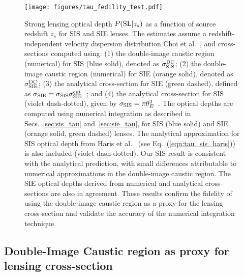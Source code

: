 \documentclass[aps,prd,twocolumn,superscriptaddress,groupedaddress,nofootinbib,showpacs,eqsecnum]{revtex4-1}
\begin{document}
\begin{figure}[ht!]
  \centering
  \hspace*{-0.02\textwidth}%
  \texttt{[image: figures/tau\_fedility\_test.pdf]}
  \caption{Strong lensing optical depth $P({\rm SL}|z_s)$ as a function of source redshift $z_s$ for SIS and SIE lenses. 
  The estimates assume a redshift-independent velocity dispersion distribution Choi et al.~\cite{Choi2007}, and cross-sections computed using: (1) the double-image caustic region (numerical) for SIS (blue solid), denoted as $\sigma^{\rm DC}_{\rm SIS}$; (2) the double-image caustic region (numerical) for SIE (orange solid), denoted as $\sigma^{\rm DC}_{\rm SIE}$; (3) the analytical cross-section for SIE (green dashed), defined as $\sigma_{\rm SIE} = \sigma_{\rm SIS} \sigma_{\rm SIE}^{\rm cut}$~\cite{feixu2022}; and (4) the analytical cross-section for SIS (violet dash-dotted), given by $\sigma_{\rm SIS} = \pi \theta_E^2$~\cite{haris2018}. The optical depths are computed using numerical integration as described in Secs.~\ref{sec:sis_tau} and~\ref{sec:sie_tau}, for SIS (blue solid) and SIE (orange solid, green dashed) lenses. The analytical approximation for SIS optical depth from Haris et al.~\cite{haris2018} (see Eq.~(\ref{eqn:tau_sis_haris})) is also included (violet dash-dotted). 
  Our SIS result is consistent with the analytical prediction, with small differences attributable to numerical approximations in the double-image caustic region. The SIE optical depths derived from numerical and analytical cross-sections are also in agreement. These results confirm the fidelity of using the double-image caustic region as a proxy for the lensing cross-section and validate the accuracy of the numerical integration technique.}
  \label{fig:tau_fedility_test}
\end{figure}

\subsection{Double-Image Caustic region as proxy for lensing cross-section}\label{sec:double_caustic}
\end{document}
